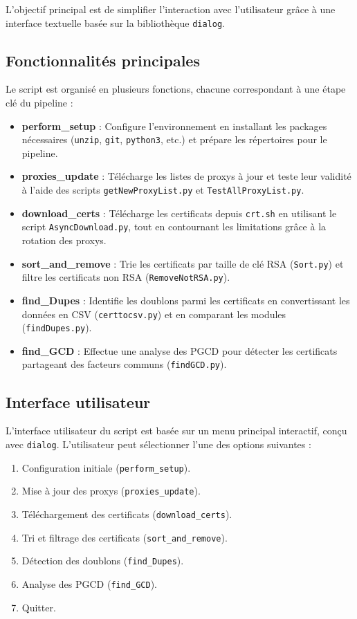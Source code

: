 \documentclass[11pt,a4paper]{article}
\begin{document}
L'objectif principal est de simplifier l'interaction avec l'utilisateur grâce à une interface textuelle basée sur la bibliothèque \texttt{dialog}.

\subsection{Fonctionnalités principales}
Le script est organisé en plusieurs fonctions, chacune correspondant à une étape clé du pipeline :
\begin{itemize}
    \item \textbf{perform\_setup} : Configure l'environnement en installant les packages nécessaires (\texttt{unzip}, \texttt{git}, \texttt{python3}, etc.) et prépare les répertoires pour le pipeline.
    \item \textbf{proxies\_update} : Télécharge les listes de proxys à jour et teste leur validité à l'aide des scripts \texttt{getNewProxyList.py} et \texttt{TestAllProxyList.py}.
    \item \textbf{download\_certs} : Télécharge les certificats depuis \texttt{crt.sh} en utilisant le script \texttt{AsyncDownload.py}, tout en contournant les limitations grâce à la rotation des proxys.
    \item \textbf{sort\_and\_remove} : Trie les certificats par taille de clé RSA (\texttt{Sort.py}) et filtre les certificats non RSA (\texttt{RemoveNotRSA.py}).
    \item \textbf{find\_Dupes} : Identifie les doublons parmi les certificats en convertissant les données en CSV (\texttt{certtocsv.py}) et en comparant les modules (\texttt{findDupes.py}).
    \item \textbf{find\_GCD} : Effectue une analyse des PGCD pour détecter les certificats partageant des facteurs communs (\texttt{findGCD.py}).
\end{itemize}

\subsection{Interface utilisateur}
L'interface utilisateur du script est basée sur un menu principal interactif, conçu avec \texttt{dialog}. L'utilisateur peut sélectionner l'une des options suivantes :
\begin{enumerate}
    \item Configuration initiale (\texttt{perform\_setup}).
    \item Mise à jour des proxys (\texttt{proxies\_update}).
    \item Téléchargement des certificats (\texttt{download\_certs}).
    \item Tri et filtrage des certificats (\texttt{sort\_and\_remove}).
    \item Détection des doublons (\texttt{find\_Dupes}).
    \item Analyse des PGCD (\texttt{find\_GCD}).
    \item Quitter.
\end{enumerate}
\end{document}
